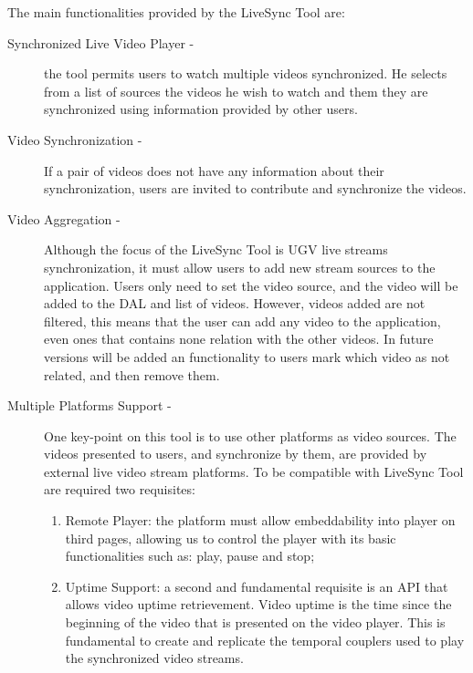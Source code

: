 The main functionalities provided by the LiveSync Tool are:

\begin{description}
	\item[Synchronized Live Video Player -]	the tool permits users to watch multiple videos synchronized. He selects from a list of sources the videos he wish to watch and them they are synchronized using information provided by other users.
	
	\item[Video Synchronization -] If a pair of videos does not have any information about their synchronization, users are invited to contribute and synchronize the videos.
	
		
	\item[Video Aggregation -]	Although the focus of the LiveSync Tool is UGV live streams synchronization, it must allow users to add new stream sources to the application. Users only need to set the video source, and the video will be added to the DAL and list of videos. However, videos added are not filtered, this means that the user can add any video to the application, even ones that contains none relation with the other videos. In future versions will be added an functionality to users mark which video as not related, and then remove them.
	
	\item[Multiple Platforms Support -] One key-point on this tool is to use other platforms as video sources. The videos presented to users, and synchronize by them, are provided by external live video stream platforms. To be compatible with LiveSync Tool are required two requisites:
	\begin{enumerate}
		\item Remote Player: the platform must allow embeddability into player on third pages, allowing us to control the player with its basic functionalities such as: play, pause and stop;
		\item Uptime Support: a second and fundamental requisite is an API that allows video uptime retrievement. Video uptime is the time since the beginning of the video that is presented on the video player. This is fundamental to create and replicate the temporal couplers used to play the synchronized video streams.
	\end{enumerate}
	

\end{description}
